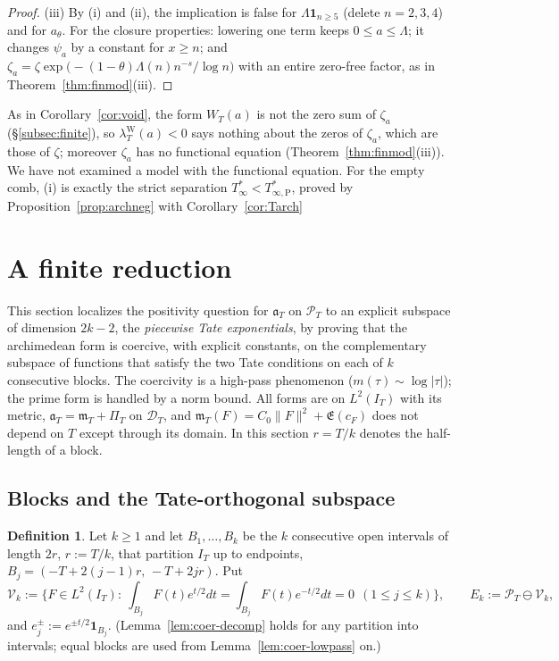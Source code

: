 \documentclass[11pt]{amsart}
\theoremstyle{definition}
\newtheorem{definition}[theorem]{Definition}
\theoremstyle{remark}
\newcommand{\PT}{\mathcal P_T}
\newcommand{\IT}{I_T}
\newcommand{\cF}{c_F}
\newcommand{\Lev}{\mathfrak E}
\newcommand{\PiT}{\Pi_T}
\newcommand{\mT}{\mathfrak m_T}
\begin{document}
\begin{proof}
(iii) By (i) and (ii), the implication is false for $\Lambda\mathbf 1_{n\ge5}$ (delete $n=2,3,4$) and for $a_\theta$.
For the closure properties: lowering one term keeps $0\le a\le\Lambda$; it changes $\psi_a$ by a constant for
$x\ge n$; and $\zeta_a=\zeta\exp\big(-(1-\theta)\Lambda(n)n^{-s}/\log n\big)$ with an entire zero-free factor, as in
Theorem~\ref{thm:finmod}(iii).
\end{proof}

As in Corollary~\ref{cor:void}, the form $W_T(a)$ is not the zero sum of $\zeta_a$ (\S\ref{subsec:finite}), so
$\lambda^{\mathrm W}_T(a)<0$ says nothing about the zeros of $\zeta_a$, which are those of $\zeta$; moreover $\zeta_a$
has no functional equation (Theorem~\ref{thm:finmod}(iii)). We have not examined a model with the
functional equation. For the empty comb, (i) is exactly the strict separation
$T^*_\infty<T^*_{\infty,\mathrm P}$, proved by Proposition~\ref{prop:archneg} with Corollary~\ref{cor:Tarch}

\section{A finite reduction}\label{sec:coer}

This section localizes the positivity question for $\mathfrak a_T$ on $\PT$ to an explicit subspace of
dimension $2k-2$, the \emph{piecewise Tate exponentials}, by proving that the archimedean form is coercive,
with explicit constants, on the complementary subspace of functions that satisfy the two Tate conditions on
each of $k$ consecutive blocks. The coercivity is a high-pass phenomenon ($m(\tau)\sim\log|\tau|$); the prime
form is handled by a norm bound. All forms are on $L^2(\IT)$ with its metric, $\mathfrak a_T=\mT+\PiT$ on
$\mathcal D_T$, and $\mT(F)=C_0\|F\|^2+\Lev(\cF)$ does not depend on $T$ except through its domain. In this
section $r=T/k$ denotes the half-length of a block.

\subsection{Blocks and the Tate-orthogonal subspace}\label{subsec:coer-blocks}

\begin{definition}\label{def:coer-V}
Let $k\ge1$ and let $B_1,\dots,B_k$ be the $k$ consecutive open intervals of length $2r$,
$r:=T/k$, that partition $\IT$ up to endpoints, $B_j=(-T+2(j-1)r,\,-T+2jr)$. Put
\[
\mathcal V_k:=\Big\{F\in L^2(\IT):\ \int_{B_j}F(t)e^{t/2}dt=\int_{B_j}F(t)e^{-t/2}dt=0\ \ (1\le j\le k)\Big\},
\qquad E_k:=\PT\ominus\mathcal V_k ,
\]
and $e_j^\pm:=e^{\pm t/2}\mathbf 1_{B_j}$. (Lemma~\ref{lem:coer-decomp} holds for any partition into
intervals; equal blocks are used from Lemma~\ref{lem:coer-lowpass} on.)
\end{definition}
\end{document}
